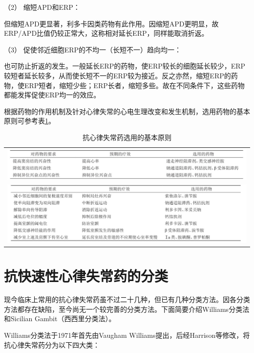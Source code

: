 \hypertarget{text00419.htmlux5cux23CHP17-4-1-4-2}{}
（2） 缩短APD和ERP：

但缩短APD更显著，利多卡因类药物有此作用。因缩短APD更明显，故ERP/APD比值仍较正常大，这称相对延长ERP，同样能取消折返。

\hypertarget{text00419.htmlux5cux23CHP17-4-1-4-3}{}
（3） 促使邻近细胞ERP的不均一（长短不一）趋向均一：

也可防止折返的发生。一般延长ERP的药物，使ERP较长的细胞延长较少，ERP较短者延长较多，从而使长短不一的ERP较为接近。反之亦然，缩短ERP的药物，使ERP短者，缩短少些；ERP长者，缩短多些。故在不同条件下，这些药物都能发挥促使ERP均一的效应。

根据药物的作用机制及针对心律失常的心电生理改变和发生机制，选用药物的基本原则可参考表\ref{tab151-1}。

\begin{longtable}{c}
 \caption{抗心律失常药选用的基本原则}
 \label{tab151-1}
 \endfirsthead
 \caption[]{抗心律失常药选用的基本原则}
 \endhead
 \includegraphics[width=\textwidth,height=\textheight,keepaspectratio]{./images/Image00566.jpg}\\
 \includegraphics[width=\textwidth,height=\textheight,keepaspectratio]{./images/Image00567.jpg}
 \end{longtable}

\protect\hypertarget{text00420.html}{}{}

\section{抗快速性心律失常药的分类}

现今临床上常用的抗心律失常药虽不过二十几种，但已有几种分类方法。因各分类方法都存在缺陷，至今尚无一个较完善的分类方法。下面简要介绍Williams分类法和Sicilian
Gambit（西西里分类法）。

Williams分类法于1971年首先由Vaugham
Williams提出，后经Harrison等修改，将抗心律失常药分为以下四大类：

